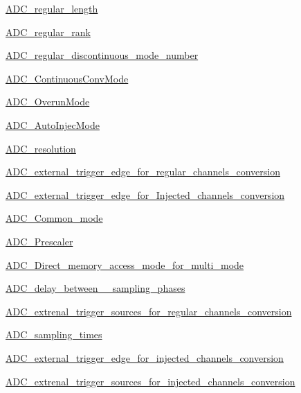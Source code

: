 \begin{DoxyCompactItemize}
\item 
\hyperlink{group___a_d_c__regular__length}{A\-D\-C\-\_\-regular\-\_\-length}
\item 
\hyperlink{group___a_d_c__regular__rank}{A\-D\-C\-\_\-regular\-\_\-rank}
\item 
\hyperlink{group___a_d_c__regular__discontinuous__mode__number}{A\-D\-C\-\_\-regular\-\_\-discontinuous\-\_\-mode\-\_\-number}
\item 
\hyperlink{group___a_d_c___continuous_conv_mode}{A\-D\-C\-\_\-\-Continuous\-Conv\-Mode}
\item 
\hyperlink{group___a_d_c___overun_mode}{A\-D\-C\-\_\-\-Overun\-Mode}
\item 
\hyperlink{group___a_d_c___auto_injec_mode}{A\-D\-C\-\_\-\-Auto\-Injec\-Mode}
\item 
\hyperlink{group___a_d_c__resolution}{A\-D\-C\-\_\-resolution}
\item 
\hyperlink{group___a_d_c__external__trigger__edge__for__regular__channels__conversion}{A\-D\-C\-\_\-external\-\_\-trigger\-\_\-edge\-\_\-for\-\_\-regular\-\_\-channels\-\_\-conversion}
\item 
\hyperlink{group___a_d_c__external__trigger__edge__for___injected__channels__conversion}{A\-D\-C\-\_\-external\-\_\-trigger\-\_\-edge\-\_\-for\-\_\-\-Injected\-\_\-channels\-\_\-conversion}
\item 
\hyperlink{group___a_d_c___common__mode}{A\-D\-C\-\_\-\-Common\-\_\-mode}
\item 
\hyperlink{group___a_d_c___prescaler}{A\-D\-C\-\_\-\-Prescaler}
\item 
\hyperlink{group___a_d_c___direct__memory__access__mode__for__multi__mode}{A\-D\-C\-\_\-\-Direct\-\_\-memory\-\_\-access\-\_\-mode\-\_\-for\-\_\-multi\-\_\-mode}
\item 
\hyperlink{group___a_d_c__delay__between__2__sampling__phases}{A\-D\-C\-\_\-delay\-\_\-between\-\_\-\_\-sampling\-\_\-phases}
\item 
\hyperlink{group___a_d_c__extrenal__trigger__sources__for__regular__channels__conversion}{A\-D\-C\-\_\-extrenal\-\_\-trigger\-\_\-sources\-\_\-for\-\_\-regular\-\_\-channels\-\_\-conversion}
\item 
\hyperlink{group___a_d_c__sampling__times}{A\-D\-C\-\_\-sampling\-\_\-times}
\item 
\hyperlink{group___a_d_c__external__trigger__edge__for__injected__channels__conversion}{A\-D\-C\-\_\-external\-\_\-trigger\-\_\-edge\-\_\-for\-\_\-injected\-\_\-channels\-\_\-conversion}
\item 
\hyperlink{group___a_d_c__extrenal__trigger__sources__for__injected__channels__conversion}{A\-D\-C\-\_\-extrenal\-\_\-trigger\-\_\-sources\-\_\-for\-\_\-injected\-\_\-channels\-\_\-conversion}
\end{DoxyCompactItemize}

